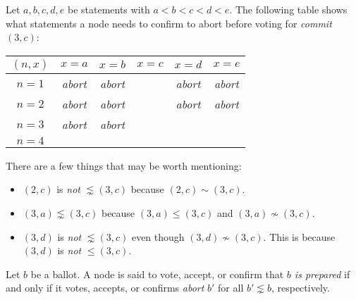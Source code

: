 \begin{exmp}
    Let $a, b, c, d, e$ be statements with $a < b < c < d < e$.
    The following table shows what statements a node needs to confirm to abort before voting for \textit{commit} $(3, c)$:
    \begin{center}
        \begin{tabular}{|c|c|c|c|c|c|}
            \hline
            $(n, x)$ & $x = a$                           & $x = b$                           & $x = c$ & $x = d$                           & $x = e$                           \\ \hline
            $n = 1$  & \cellcolor{blue!25}\textit{abort} & \cellcolor{blue!25}\textit{abort} &         & \cellcolor{blue!25}\textit{abort} & \cellcolor{blue!25}\textit{abort} \\ \hline
            $n = 2$  & \cellcolor{blue!25}\textit{abort} & \cellcolor{blue!25}\textit{abort} &         & \cellcolor{blue!25}\textit{abort} & \cellcolor{blue!25}\textit{abort} \\ \hline
            $n = 3$  & \cellcolor{blue!25}\textit{abort} & \cellcolor{blue!25}\textit{abort} &         &                                   &                                   \\ \hline
            $n = 4$  &                                   &                                   &         &                                   &                                   \\ \hline
        \end{tabular}
    \end{center}

    There are a few things that may be worth mentioning:
    \begin{itemize}
        \item
            $(2, c)$ is \textit{not} $\lnsim (3, c)$ because $(2, c) \sim (3, c)$.
        \item
            $(3, a) \lnsim (3, c)$ because $(3, a) \leq (3, c)$ and $(3, a) \nsim (3, c)$.
        \item
            $(3, d)$ is \textit{not} $\lnsim (3, c)$ even though $(3, d) \nsim (3, c)$.
            This is because $(3, d)$ is \textit{not} $\leq (3, c)$.
    \end{itemize}
\end{exmp}

\begin{defn}[Prepare]\label{def_prepare}
    Let $b$ be a ballot.
    A node is said to vote, accept, or confirm that \textit{$b$ is prepared} if and only if it votes, accepts, or confirms \textit{abort} $b'$ for all $b' \lnsim b$, respectively.
\end{defn}


